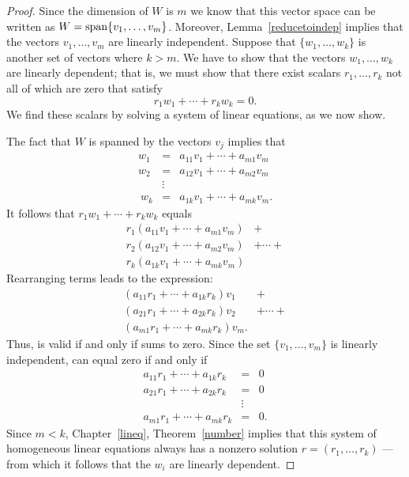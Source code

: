 \documentclass{ximera}
\begin{document}
\begin{proof} Since the dimension of $W$ is $m$ we know that
this vector space can be written as $W={\rm span}\{v_1,\ldots,v_m\}$.
Moreover, Lemma~\ref{reducetoindep} implies that the vectors
$v_1,\ldots,v_m$ are linearly independent.  Suppose that
$\{w_1,\ldots,w_k\}$ is another set of vectors where $k>m$.
We have to show that the vectors $w_1,\ldots,w_k$ are linearly
dependent; that is, we must show that there exist scalars
$r_1,\ldots,r_k$ not all of which are zero that satisfy
\begin{equation} \label{independence1}
r_1w_1 + \cdots + r_kw_k = 0.
\end{equation}
We find these scalars by solving a system of linear equations, as
we now show.

The fact that $W$ is spanned by the vectors $v_j$ implies that
\begin{eqnarray*}
w_1 & = & a_{11}v_1 + \cdots + a_{m1}v_m\ \\
w_2 & = & a_{12}v_1 + \cdots + a_{m2}v_m\ \\
 & \vdots & \\\
w_k & = & a_{1k}v_1 + \cdots + a_{mk}v_m.
\end{eqnarray*}
It follows that $r_1w_1 + \cdots + r_kw_k$ equals
\[
\begin{array}{ll}
r_1(a_{11}v_1 + \cdots + a_{m1}v_m) & +  \\
r_2(a_{12}v_1 + \cdots + a_{m2}v_m) & + \cdots + \\
r_k(a_{1k}v_1 + \cdots + a_{mk}v_m) &
\end{array}
\]
Rearranging terms leads to the expression:
\begin{equation}   \label{e:r1v1etc}
\begin{array}{ll}
(a_{11}r_1 + \cdots + a_{1k}r_k)v_1\ & + \\
(a_{21}r_1 + \cdots + a_{2k}r_k)v_2\ & + \cdots + \\
(a_{m1}r_1 + \cdots + a_{mk}r_k)v_m. &
\end{array}
\end{equation}
Thus,  is valid if and only if 
sums to zero.  Since the set $\{v_1,\ldots,v_m\}$ is linearly
independent, \Ref{e:r1v1etc} can equal zero if and only if
\begin{eqnarray*}
a_{11}r_1 + \cdots + a_{1k}r_k & = & 0\ \\
a_{21}r_1 + \cdots + a_{2k}r_k & = & 0\ \\
          & \vdots &   \\
a_{m1}r_1 + \cdots + a_{mk}r_k & = & 0.
\end{eqnarray*}
Since $m<k$, Chapter~\ref{lineq}, Theorem~\ref{number} implies that
this system of homogeneous linear equations always has a nonzero
solution $r=(r_1,\ldots,r_k)$ --- from which it follows that the
$w_i$ are linearly dependent.  \end{proof}
\end{document}
